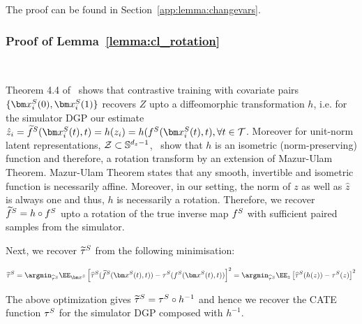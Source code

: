 The proof can be found in Section~\ref{app:lemma:changevars}.



\subsubsection{Proof of Lemma~\ref{lemma:cl_rotation}}
\label{app:lemma:cl_rotation}
    \lemmaclrotation\

{Theorem 4.4 of~\citep{von2021self} shows that contrastive training with covariate pairs $\{\xb_i^S(0), \xb_i^S(1)\}$ recovers $Z$ upto a diffeomorphic transformation $h$, i.e. for the simulator DGP our estimate $\hat{z}_i = \SInvTilde(\xb^S_i(t), t) = h(z_i) = h(\SInv(\xb^S_i(t), t), \forall t \in \Tspace$. Moreover for unit-norm latent representations, $\mathcal{Z} \subset \mathbb{S}^{d_z - 1}$,~\citep{zimmermann2021cl} show that $h$ is an isometric (norm-preserving) function and therefore, a rotation transform by an extension of Mazur-Ulam Theorem.  Mazur-Ulam Theorem states that any smooth, invertible and isometric function is necessarily affine. Moreover, in our setting, the norm of $z$ as well as $\hat{z}$ is always one and thus, $h$ is necessarily a rotation. Therefore, we recover $\widetilde{f}^S = h \circ f^S$ upto a rotation of the true inverse map $f^S$ with sufficient paired samples from the simulator.

Next, we recover $\widetilde{\tau}^S$ from the following minimisation:

\begin{align*}
    \syntauTilde %
    = \argmin_{\syntauhat} \EE_{\xb^S} \left[ \syntauhat(\SInvTilde(\xb^S(t), t)) - \syntau(\SInv(\xb^S(t), t))\right]^2
    = \argmin_{\syntauhat} \EE_{z} \left[ \syntauhat(h(z)) - \syntau(z)\right]^2
\end{align*}

The above optimization gives $\widetilde{\tau}^S = \tau^S \circ h^{-1}$ and hence we recover the CATE function $\tau^S$ for the simulator DGP composed with $h^{-1}$.
} 



